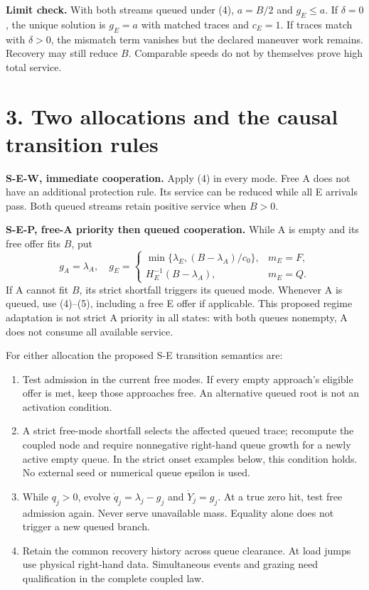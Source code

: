 \documentclass[11pt,a4paper]{article}
\begin{document}
\textbf{Limit check.} With both streams queued under (4), $a=B/2$ and
$g_E\leq a$. If $\delta=0$, the unique solution is $g_E=a$ with matched
traces and $c_E=1$. If traces match with $\delta>0$, the mismatch term
vanishes but the declared maneuver work remains. Recovery may still reduce
$B$. Comparable speeds do not by themselves prove high total service.

\newpage
\section*{3. Two allocations and the causal transition rules}

\textbf{S-E-W, immediate cooperation.} Apply (4) in every mode. Free A
does not have an additional protection rule. Its service can be reduced
while all E arrivals pass. Both queued streams retain positive service
when $B>0$.

\textbf{S-E-P, free-A priority then queued cooperation.} While A is empty
and its free offer fits $B$, put
\begin{equation}
 g_A=\lambda_A,\quad
 g_E=\begin{cases}
 \min\{\lambda_E,(B-\lambda_A)/c_0\},&m_E=F,\\
 H_E^{-1}(B-\lambda_A),&m_E=Q.
 \end{cases} \tag{9}
\end{equation}
If A cannot fit $B$, its strict shortfall triggers its queued mode.
Whenever A is queued, use (4)--(5), including a free E offer if applicable.
This proposed regime adaptation is not strict A priority in all states:
with both queues nonempty, A does not consume all available service.

For either allocation the proposed S-E transition semantics are:
\begin{enumerate}
\item Test admission in the current free modes. If every empty approach's
eligible offer is met, keep those approaches free. An alternative queued
root is not an activation condition.
\item A strict free-mode shortfall selects the affected queued trace;
recompute the coupled node and require nonnegative right-hand queue growth
for a newly active empty queue. In the strict onset examples below, this
condition holds. No external seed or numerical queue epsilon is used.
\item While $q_j>0$, evolve $\dot q_j=\lambda_j-g_j$ and
$\dot Y_j=g_j$. At a true zero hit, test free admission again. Never serve
unavailable mass. Equality alone does not trigger a new queued branch.
\item Retain the common recovery history across queue clearance. At load
jumps use physical right-hand data. Simultaneous events and grazing need
qualification in the complete coupled law.
\end{enumerate}
\end{document}

